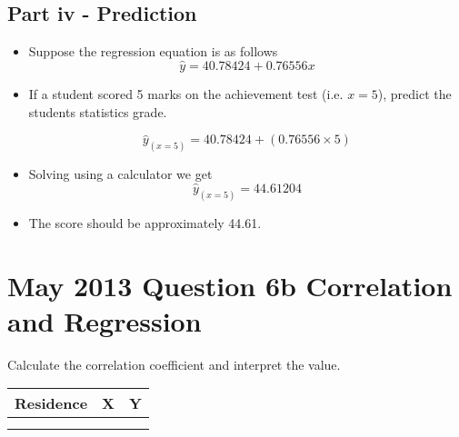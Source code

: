 \documentclass[]{report}
\begin{document}

\subsection*{Part iv - Prediction}
\begin{itemize}
	\item Suppose the regression equation is as follows
	\[ \hat{y} = 40.78424 + 0.76556 x \]
	\item If a student scored 5 marks on the achievement test (i.e. $x=5$), predict the students statistics grade.
	
	\[ \hat{y}_{(x=5)} = 40.78424 + (0.76556 \times 5) \]
	
	\item Solving using a calculator we get
	\[ \hat{y}_{(x=5)} = 44.61204 \]
	
	\item The score should be approximately 44.61.
\end{itemize}





\section*{May 2013 Question 6b Correlation and Regression }
Calculate the correlation coefficient and interpret the value.
\begin{tabular}{|c|c|c|}
	\hline Residence	& X	  & Y \\ 
	\hline  &  &  \\ 
	\hline  &  &  \\ 
	\hline 
\end{tabular} 
\end{document}
